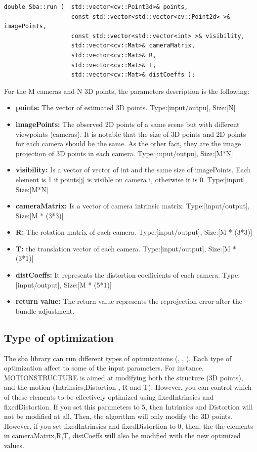 \begin{lstlisting}
double Sba::run (  std::vector<cv::Point3d>& points,
                   const std::vector<std::vector<cv::Point2d> >& imagePoints,
                   const std::vector<std::vector<int> >& visibility,
                   std::vector<cv::Mat>& cameraMatrix,
                   std::vector<cv::Mat>& R,
                   std::vector<cv::Mat>& T,
                   std::vector<cv::Mat>& distCoeffs );

\end{lstlisting} \label{lst:cvsba}
For the M cameras and N 3D points, the parameters description is the following:
\begin{itemize}
\item \textbf{points:} The vector of estimated 3D points. Type:[input/outpu], Size:[N]
\item \textbf{imagePoints:} The observed 2D points of a same scene but with different viewpoints (cameras). It is notable that the size of 3D points and 2D points for each camera should be the same. As the other fact, they are the image projection of 3D points in each camera. Type:[input/outpu], Size:[M*N]
\item \textbf{visibility:} Is a vector of vector of int and the same size of imagePoints. Each element is 1 if points[j] is visible on camera i, otherwise it is 0. Type:[input], Size:[M*N] 
\item \textbf{cameraMatrix:} Is a vector of camera intrinsic matrix. Type:[input/output], Size:[M * (3*3)]
\item \textbf{R:} The rotation matrix of each camera. Type:[input/output], Size:[M * (3*3)]
\item \textbf{T:} the translation vector of each camera. Type:[input/output], Size:[M * (3*1)]
\item \textbf{distCoeffs:} It represents the distortion coefficients of each camera. Type:[input/output], Size:[M * (5*1)]
\item \textbf{return value:} The return value represents the reprojection error after the bundle adjustment.
\end{itemize}

\subsection{Type of optimization} \label{subsec:type_of_optimization}
The sba library can run different types of optimizations (, , ). Each type of optimization affect to some of the input parameters. For instance, MOTIONSTRUCTURE is aimed at modifying both the structure (3D points), and the motion (Intrinsics,Distortion , R and T). However, you can control which of these elements to be effectively optimized using fixedIntrinsics and fixedDistortion. If you set this parameters to 5, then Intrinsics and Distortion will not be modified at all. Then, the algorithm will only modify the 3D points. However, if you set  fixedIntrinsics and fixedDistortion to 0, then,  the the elements in cameraMatrix,R,T, distCoeffs will also be modified with the new optimized values.

